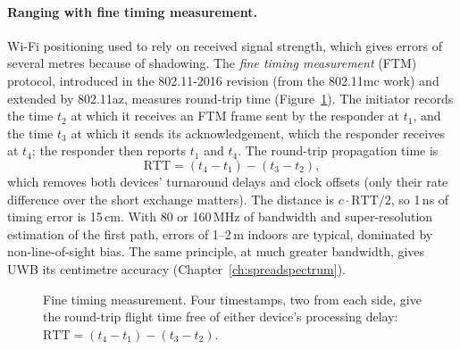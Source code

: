 \paragraph{Ranging with fine timing measurement.} Wi-Fi positioning used to rely on received signal
strength, which gives errors of several metres because of shadowing. The \emph{fine timing
measurement} (FTM) protocol, introduced in the 802.11-2016 revision (from the 802.11mc work) and
extended by 802.11az, measures round-trip time (Figure~\ref{fig:ch22_ftm}). The initiator records the
time $t_2$ at which it receives an FTM frame sent by the responder at $t_1$, and the time $t_3$ at
which it sends its acknowledgement, which the responder receives at $t_4$; the responder then
reports $t_1$ and $t_4$. The round-trip propagation time is
\begin{equation}
\text{RTT}=(t_4-t_1)-(t_3-t_2),
\label{eq:ch22:ftm}
\end{equation}
which removes both devices' turnaround delays and clock offsets (only their rate difference over the
short exchange matters). The distance is $c\cdot\text{RTT}/2$, so 1\,ns of timing error is 15\,cm.
With 80 or 160\,MHz of bandwidth and super-resolution estimation of the first path, errors of
1--2\,m indoors are typical, dominated by non-line-of-sight bias. The same principle, at much greater
bandwidth, gives UWB its centimetre accuracy (Chapter~\ref{ch:spreadspectrum}).

\begin{figure}[htbp]\centering
{}
\caption{Fine timing measurement. Four timestamps, two from each side, give the round-trip flight
time free of either device's processing delay: $\text{RTT}=(t_4-t_1)-(t_3-t_2)$.}
\label{fig:ch22_ftm}
\end{figure}

